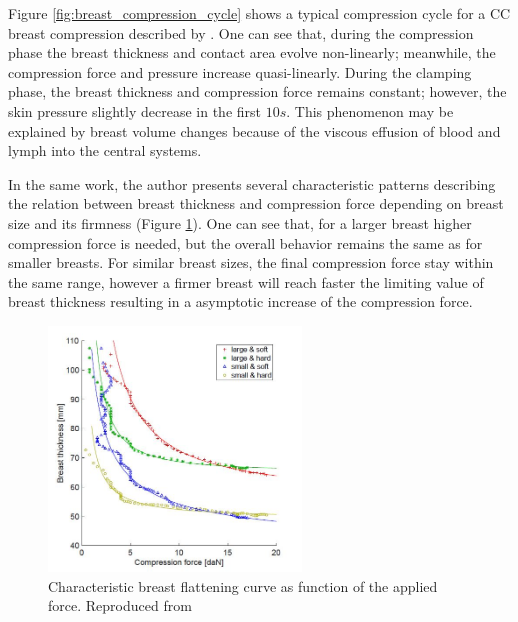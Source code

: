 Figure \ref{fig:breast_compression_cycle} shows a typical compression cycle for a CC breast compression described by \cite{de_pain_2015}. One can see that, during the compression phase the breast thickness and contact area evolve non-linearly; meanwhile, the compression force and pressure increase quasi-linearly. During the clamping phase, the breast thickness and compression force remains constant; however, the skin pressure  slightly decrease in the first $10s$. This  phenomenon may be explained by breast volume changes because of the viscous effusion of blood and lymph into the central systems. 

In the same work, the author presents several characteristic patterns  describing the relation between breast thickness and compression force depending on breast size and its firmness (Figure \ref{fig:thickness_force_patterns_groot}). One can see that, for a larger breast higher compression force is needed, but the overall behavior remains the same as for smaller breasts. For similar breast sizes, the final compression force stay within the same range, however a firmer breast will reach faster the limiting value of breast thickness resulting in a asymptotic increase of the compression force.
\begin{figure}[!h]
\centering
\includegraphics[width=0.6\textwidth,keepaspectratio]{figures/thickness_force_patterns_groot.jpg} 
\caption{Characteristic breast flattening curve as function of the applied force. Reproduced from \cite{groot_towards_2015}}\label{fig:thickness_force_patterns_groot}
\end{figure}

